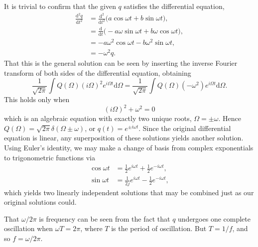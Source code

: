 \documentclass[../road-to-reality.tex]{subfiles}
\begin{document}
\begin{questions}
  \begin{solution}
    It is trivial to confirm that the given $q$ satisfies the differential
    equation,
    \begin{align*}
      \frac{\mathrm{d}^2q}{\mathrm{d}t^2} &= \frac{\mathrm{d}^2}{\mathrm{d}t^2}\Big(a\cos\omega{t} + b\sin\omega{t}\Big), \\
                                          &= \frac{\mathrm{d}}{\mathrm{d}t}\Big(-a\omega\sin\omega{t} + b\omega\cos\omega{t}\Big), \\
                                          &= -a\omega^2\cos\omega{t} - b\omega^2\sin\omega{t}, \\
                                          &= -\omega^2q.
    \end{align*}
    That this is the general solution can be seen by inserting the inverse
    Fourier transform of both sides of the differential equation, obtaining
    \[
      \frac{1}{\sqrt{2\pi}}\int{Q}(\Omega)(i\Omega)^2e^{i\Omega{t}}\mathrm{d}\Omega
      = \frac{1}{\sqrt{2\pi}}\int{Q}(\Omega)(-\omega^2)e^{i\Omega{t}}\mathrm{d}\Omega.
    \]
    This holds only when
    \[
      (i\Omega)^2 + \omega^2 = 0
    \]
    which is an algebraic equation with exactly two unique roots, $\Omega =
    \pm{\omega}$. Hence $Q(\Omega) = \sqrt{2\pi}\delta(\Omega \pm \omega)$, or
    $q(t) = e^{\pm{i}\omega{t}}$. Since the original differential equation is
    linear, any superposition of these solutions yields another solution. Using
    Euler's identity, we may make a change of basis from complex exponentials to
    trigonometric functions via 
    \begin{align*}
      \cos\omega{t} &= \frac{1}{2}e^{i\omega{t}} + \frac{1}{2}e^{-i\omega{t}}, \\
      \sin\omega{t} &= \frac{1}{2j}e^{i\omega{t}} - \frac{1}{2}e^{-i\omega{t}},
    \end{align*}
    which yields two linearly independent solutions that may be combined just as
    our original solutions could.

    That $\omega/2\pi$ is frequency can be seen from the fact that $q$ undergoes
    one complete oscillation when $\omega{T}=2\pi$, where $T$ is the period of
    oscillation. But $T = 1/f$, and so $f = \omega/2\pi$.


\end{solution}
\end{questions}
\end{document}
